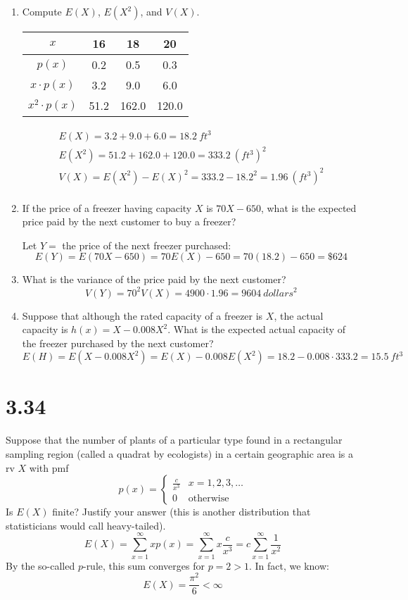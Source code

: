 \documentclass[letterpaper,12pt,fleqn]{article}
\begin{document}
\begin{enumerate}[label={\alph*)}]
\item Compute \(E(X)\), \(E(X^2)\), and \(V(X)\).

  \bigskip
  
  \begin{tabular}{c|ccc}
    \(x\) & 16 & 18 & 20 \\
    \hline
    \(p(x)\) & 0.2 & 0.5 & 0.3 \\
    \hline
    \(x\cdot p(x)\) & 3.2 & 9.0 & 6.0 \\
    \(x^2\cdot p(x)\) & 51.2 & 162.0 & 120.0 \\
  \end{tabular}

  \begin{gather*}
    E(X)=3.2+9.0+6.0=\SI{18.2}{ft^3} \\
    E(X^2)=51.2+162.0+120.0=\SI{333.2}{(ft^3)^2} \\
    V(X)=E(X^2)-E(X)^2=333.2-18.2^2=\SI{1.96}{(ft^3)^2} \\
  \end{gather*}

\item If the price of a freezer having capacity \(X\) is \(70X-650\), what is the expected price paid by the next
  customer to buy a freezer?

  Let \(Y=\) the price of the next freezer purchased:
  \[E(Y)=E(70X-650)=70E(X)-650=70(18.2)-650=\$624\]

\item What is the variance of the price paid by the next customer?
  \[V(Y)=70^2V(X)=4900\cdot1.96=\SI{9604}{dollars^2}\]

\item Suppose that although the rated capacity of a freezer is \(X\), the actual capacity is \(h(x)=X-0.008X^2\).  What is
  the expected actual capacity of the freezer purchased by the next customer?
  \[E(H)=E(X-0.008X^2)=E(X)-0.008E(X^2)=18.2-0.008\cdot333.2=\SI{15.5}{ft^3}\]
\end{enumerate}

\section*{3.34}

Suppose that the number of plants of a particular type found in a rectangular sampling region (called a quadrat by
ecologists) in a certain geographic area is a rv \(X\) with pmf
\[p(x)=\begin{cases}
\frac{c}{x^3} & x=1,2,3,\ldots \\
0 & \text{otherwise}
\end{cases}\]
Is \(E(X)\) finite? Justify your answer (this is another distribution that statisticians would call heavy-tailed).
\[E(X)=\sum_{x=1}^{\infty}xp(x)=\sum_{x=1}^{\infty}x\frac{c}{x^3}=c\sum_{x=1}^{\infty}\frac{1}{x^2}\]
By the so-called \(p\)-rule, this sum converges for \(p=2>1\).  In fact, we know:
\[E(X)=\frac{\pi^2}{6}<\infty\]
\end{document}
